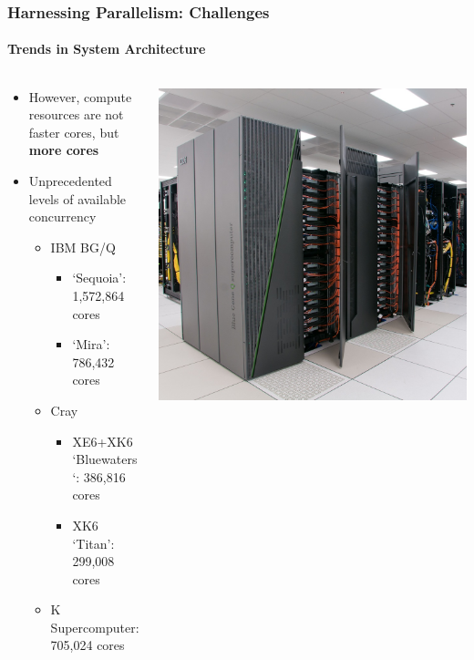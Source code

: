 \begin{frame}[shrink]
\frametitle{Harnessing Parallelism: Challenges}
\framesubtitle{Trends in System Architecture}
  \begin{columns}
    \begin{column}{0.60\textwidth}
      \begin{itemize}
      \item However, compute resources are not faster cores, but \textbf{more cores}
      \item Unprecedented levels of available concurrency
        \begin{itemize}
        \item IBM BG/Q
          \begin{itemize}
          \item `Sequoia': 1,572,864 cores
          \item `Mira': 786,432 cores
          \end{itemize}
        \item Cray
          \begin{itemize}
          \item XE6+XK6 `Bluewaters`: 386,816 cores
          \item XK6 `Titan': 299,008 cores
          \end{itemize}
        \item K Supercomputer: 705,024 cores
        \end{itemize}
      \end{itemize}
    \end{column}
    \begin{column}{0.40\textwidth}
      \includegraphics[width=1\textwidth]{figures/mira.jpg}
    \end{column}
  \end{columns}


\end{frame}

